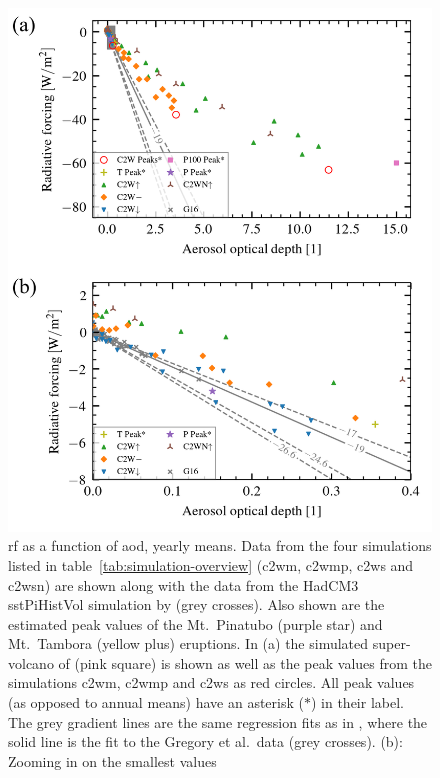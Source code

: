 \documentclass{ametsocV6.1}
\begin{document}
\begin{figure}
  \centering
  \includegraphics[width=0.95\linewidth]{figures/figure3.png}

  \caption{\gls{rf} as a function of \gls{aod}, yearly means. Data from the four
    simulations listed in table~\ref{tab:simulation-overview} (\gls{c2wm}, \gls{c2wmp},
    \gls{c2ws} and \gls{c2wsn}) are shown along with the data from the HadCM3 sstPiHistVol
    simulation by \citet{gregory2016} (grey crosses). Also shown are the estimated peak
    values of the Mt.\ Pinatubo (purple star) and Mt.\ Tambora (yellow plus) eruptions. In
    (a) the simulated super-volcano of \citet{jones2005} (pink square) is shown as well as
    the peak values from the simulations \gls{c2wm}, \gls{c2wmp} and \gls{c2ws} as red
    circles. All peak values (as opposed to annual means) have an asterisk (\(\ast{}\)) in
    their label. The grey gradient lines are the same regression fits as in \citet[][Fig.\
      4]{gregory2016}, where the solid line is the fit to the Gregory et al.\ data (grey
    crosses). (b): Zooming in on the smallest values}\label{fig:aod_vs_toa_ses_avg}%
\end{figure}
\end{document}
